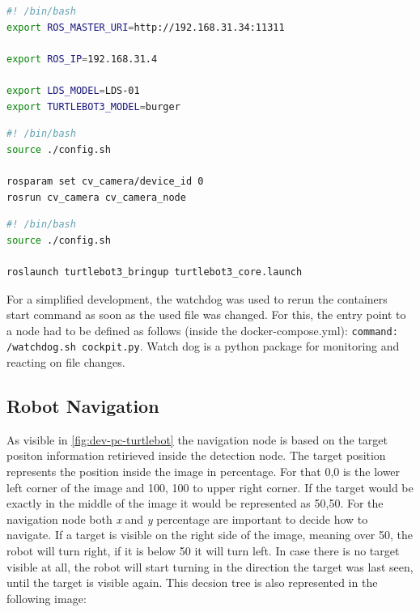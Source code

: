 {\scriptsize
\begin{lstlisting}[language=sh,frame=single,caption=config.sh,label=code:config]
#! /bin/bash
export ROS_MASTER_URI=http://192.168.31.34:11311

export ROS_IP=192.168.31.4

export LDS_MODEL=LDS-01
export TURTLEBOT3_MODEL=burger
\end{lstlisting}
}

{\scriptsize
\begin{lstlisting}[language=sh,frame=single,caption=cam.sh,label=code:cam]
#! /bin/bash
source ./config.sh

rosparam set cv_camera/device_id 0
rosrun cv_camera cv_camera_node
\end{lstlisting}
}

{\scriptsize
\begin{lstlisting}[language=sh,frame=single,caption=launch.sh,label=code:launch]
#! /bin/bash
source ./config.sh

roslaunch turtlebot3_bringup turtlebot3_core.launch
\end{lstlisting}
}

For a simplified development, the watchdog was used to rerun the containers start command as soon as the used file was changed. For this, the entry point to a node had to be defined as follows (inside the docker-compose.yml): \lstinline|command: /watchdog.sh cockpit.py|. Watch dog is a python package for monitoring and reacting on file changes.\cite{watchdog}


\subsection{Robot Navigation}
As visible in \autoref{fig:dev-pc-turtlebot} the navigation node is based on the target positon information retirieved inside the detection node. The target position represents the position inside the image in percentage. For that 0,0 is the lower left corner of the image and 100, 100 to upper right corner. If the target would be exactly in the middle of the image it would be represented as 50,50.
For the navigation node both \textit{x} and \textit{y} percentage are important to decide how to navigate. If a target is visible on the right side of the image, meaning over 50, the robot will turn right, if it is below 50 it will turn left. In case there is no target visible at all, the robot will start turning in the direction the target was last seen, until the target is visible again.
This decsion tree is also represented in the following image:

